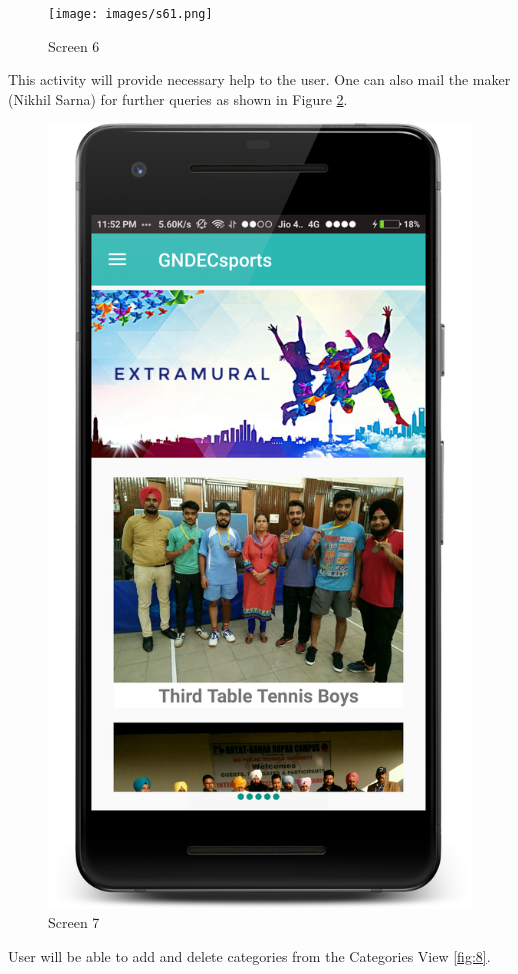 \begin{figure}[ht]
\centering
\texttt{[image: images/s61.png]}
\caption{Screen 6}
\label{fig:6}
\end{figure}

\noindent This activity will provide necessary help to the user. One can also mail the maker
(Nikhil Sarna) for further queries as shown in Figure \ref{fig:7}. 

\begin{figure}[ht]
\centering
\includegraphics[scale=0.38]{images/s7.png}
\caption{Screen 7}
\label{fig:7}
\end{figure}
\noindent User will be able to add and delete categories from the Categories View \ref{fig:8}. 

